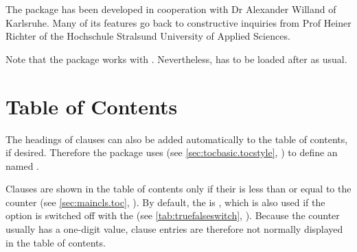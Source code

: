 The package has been developed in cooperation with Dr Alexander Willand of
Karlsruhe. Many of its features go back to constructive inquiries from Prof
Heiner Richter of the Hochschule Stralsund University of Applied Sciences.

Note that the package works with
. Nevertheless, 
has to be loaded after  as usual.



\section{Table of Contents}
\label{sec:scrjura.toc}

The headings of clauses can also be added automatically to the table of
contents, if desired.
Therefore the package uses
(see \autoref{sec:tocbasic.tocstyle},
) to define an  named .


\begin{Declaration}
\end{Declaration}
Clauses are shown in the table of contents only if their
 is less than or equal to the
%
 counter
(see \autoref{sec:maincls.toc}, ). By
default, the  is , which is also used if
the option is switched off with the  (see
\autoref{tab:truefalseswitch}, ). Because the
 counter usually has a one-digit value,
clause entries are therefore not normally displayed in the table of contents.

